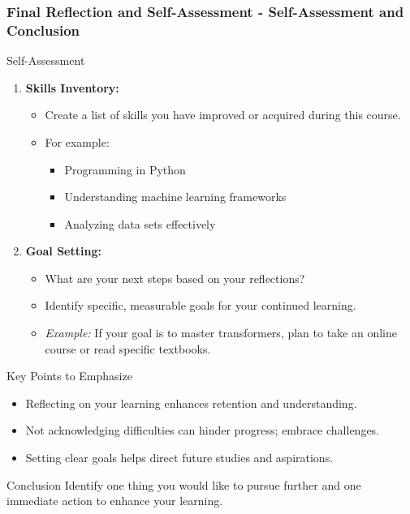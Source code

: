 \documentclass[aspectratio=169]{beamer}
\begin{document}
\begin{frame}[fragile]
    \frametitle{Final Reflection and Self-Assessment - Self-Assessment and Conclusion}
    \begin{block}{Self-Assessment}
        \begin{enumerate}
            \item \textbf{Skills Inventory:}
            \begin{itemize}
                \item Create a list of skills you have improved or acquired during this course.
                \item For example: 
                \begin{itemize}
                    \item Programming in Python 
                    \item Understanding machine learning frameworks 
                    \item Analyzing data sets effectively
                \end{itemize}
            \end{itemize}

            \item \textbf{Goal Setting:}
            \begin{itemize}
                \item What are your next steps based on your reflections?
                \item Identify specific, measurable goals for your continued learning.
                \item \textit{Example:} If your goal is to master transformers, plan to take an online course or read specific textbooks.
            \end{itemize}
        \end{enumerate}
    \end{block}

    \begin{block}{Key Points to Emphasize}
        \begin{itemize}
            \item Reflecting on your learning enhances retention and understanding.
            \item Not acknowledging difficulties can hinder progress; embrace challenges.
            \item Setting clear goals helps direct future studies and aspirations.
        \end{itemize}
    \end{block}

    \begin{block}{Conclusion}
        Identify one thing you would like to pursue further and one immediate action to enhance your learning.
    \end{block}
\end{frame}
\end{document}
